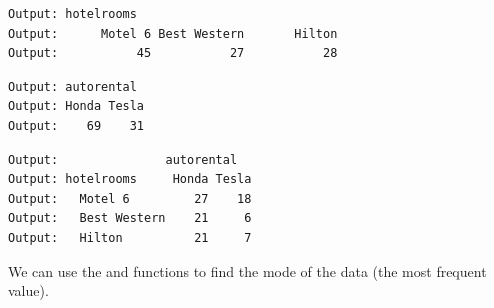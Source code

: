 \begin{knitrout}
\color{fgcolor}\begin{kframe}
\begin{alltt}
 \hlkwb{<-} \hlstd{(}\hlstd{(}\hlstd{),} \hlstd{=} \hlstd{(}\hlstd{,}\hlstd{,}\hlstd{,}\hlstd{),}  \hlstd{=} \hlstd{)}
 \hlkwb{<-} \hlstd{(}\hlstd{,} \hlstd{,} \hlstd{)}
 \hlkwb{<-} \hlstd{(}\hlstd{(}\hlstd{),} \hlstd{=} \hlstd{(}\hlstd{,}\hlstd{,}\hlstd{),}  \hlstd{=} \hlstd{)}
 \hlkwb{<-} \hlstd{(}\hlstd{,} \hlstd{)}
 \hlkwb{<-} 
\end{alltt}
\begin{verbatim}
Output: hotelrooms
Output:      Motel 6 Best Western       Hilton 
Output:           45           27           28
\end{verbatim}
\begin{alltt}
 \hlkwb{<-} 
\end{alltt}
\begin{verbatim}
Output: autorental
Output: Honda Tesla 
Output:    69    31
\end{verbatim}
\begin{alltt}
\end{alltt}
\begin{verbatim}
Output:               autorental
Output: hotelrooms     Honda Tesla
Output:   Motel 6         27    18
Output:   Best Western    21     6
Output:   Hilton          21     7
\end{verbatim}
\end{kframe}
\end{knitrout}

We can use the  and  functions to find the mode of the data (the most frequent value).

